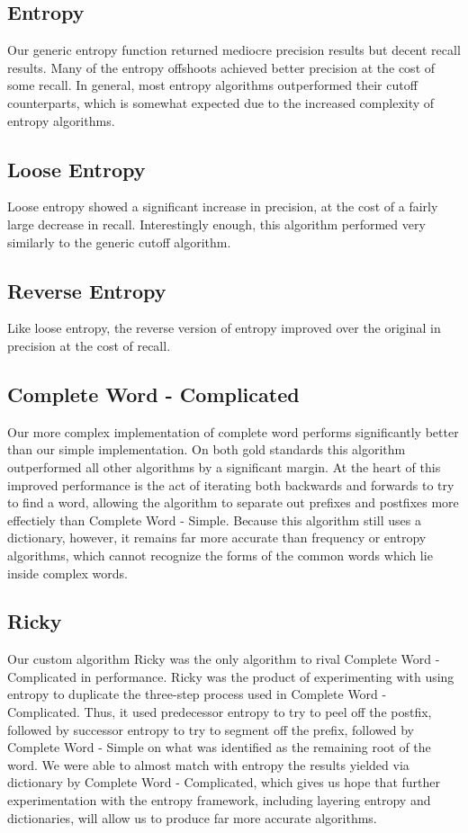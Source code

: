 \documentclass[11pt,letterpaper]{article}
\begin{document}
    
\subsection{Entropy}
	Our generic entropy function returned mediocre precision results but decent recall results.   Many of the entropy offshoots achieved better precision at the cost of some recall.  In general, most entropy algorithms outperformed their cutoff counterparts, which is somewhat expected due to the increased complexity of entropy algorithms.

\subsection{Loose Entropy}
    Loose entropy showed a significant increase in precision, at the cost of a fairly large decrease in recall.  Interestingly enough, this algorithm performed very similarly to the generic cutoff algorithm.
\subsection{Reverse Entropy}
  Like loose entropy, the reverse version of entropy improved over the original in precision at the cost of recall. 
  
\subsection{Complete Word - Complicated}
	Our more complex implementation of complete word performs significantly better than our simple implementation. On both gold standards this algorithm outperformed all other algorithms by a significant margin. At the heart of this improved performance is the act of iterating both backwards and forwards to try to find a word, allowing the algorithm to separate out prefixes and postfixes more effectiely than Complete Word - Simple. Because this algorithm still uses a dictionary, however, it remains far more accurate than frequency or entropy algorithms, which cannot recognize the forms of the common words which lie inside complex words. 
  
\subsection{Ricky}
	Our custom algorithm Ricky was the only algorithm to rival Complete Word - Complicated in performance. Ricky was the product of experimenting with using entropy to duplicate the three-step process used in Complete Word - Complicated. Thus, it used predecessor entropy to try to peel off the postfix, followed by successor entropy to try to segment off the prefix, followed by Complete Word - Simple on what was identified as the remaining root of the word. We were able to almost match with entropy the results yielded via dictionary by Complete Word - Complicated, which gives us hope that further experimentation with the entropy framework, including layering entropy and dictionaries, will allow us to produce far more accurate algorithms. 
\end{document}
